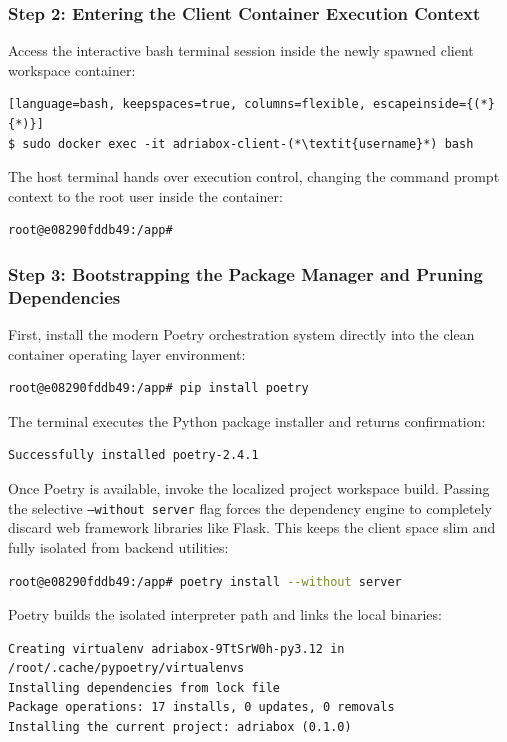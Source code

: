 \subsubsection{Step 2: Entering the Client Container Execution Context}
Access the interactive bash terminal session inside the newly spawned client workspace container:
\begin{lstlisting}[language=bash, keepspaces=true, columns=flexible, escapeinside={(*}{*)}]
$ sudo docker exec -it adriabox-client-(*\textit{username}*) bash
\end{lstlisting}
The host terminal hands over execution control, changing the command prompt context to the root user inside the container:
\begin{lstlisting}[basicstyle=\small\ttfamily, frame=single, keepspaces=true, columns=flexible]
root@e08290fddb49:/app#
\end{lstlisting}

\subsubsection{Step 3: Bootstrapping the Package Manager and Pruning Dependencies}
First, install the modern Poetry orchestration system directly into the clean container operating layer environment:
\begin{lstlisting}[language=bash, keepspaces=true, columns=flexible]
root@e08290fddb49:/app# pip install poetry
\end{lstlisting}
The terminal executes the Python package installer and returns confirmation:
\begin{lstlisting}[basicstyle=\small\ttfamily, breaklines=true, frame=single, keepspaces=true, columns=flexible]
Successfully installed poetry-2.4.1
\end{lstlisting}

Once Poetry is available, invoke the localized project workspace build. Passing the selective \texttt{--without server} flag forces the dependency engine to completely discard web framework libraries like Flask. This keeps the client space slim and fully isolated from backend utilities:
\begin{lstlisting}[language=bash, keepspaces=true, columns=flexible]
root@e08290fddb49:/app# poetry install --without server
\end{lstlisting}
Poetry builds the isolated interpreter path and links the local binaries:
\begin{lstlisting}[basicstyle=\small\ttfamily, breaklines=true, frame=single, keepspaces=true, columns=flexible]
Creating virtualenv adriabox-9TtSrW0h-py3.12 in /root/.cache/pypoetry/virtualenvs
Installing dependencies from lock file
Package operations: 17 installs, 0 updates, 0 removals
Installing the current project: adriabox (0.1.0)
\end{lstlisting}

